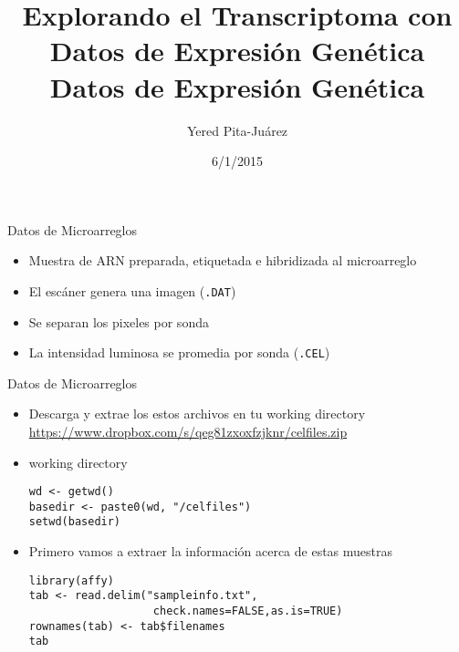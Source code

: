\documentclass{beamer}
\begin{document}
\title[Datos de Expresi\'{o}n Gen\'{e}tica]{Explorando el Transcriptoma con Datos de Expresi\'{o}n Gen\'{e}tica\\
\vspace{0.5cm}
Datos de Expresi\'{o}n Gen\'{e}tica}
\author{Yered Pita-Ju\'{a}rez}
\date{6/1/2015}


\begin{frame}
\titlepage
\end{frame}


\begin{frame}{Datos de Microarreglos}
\begin{itemize}
\item Muestra de ARN preparada, etiquetada e hibridizada al microarreglo
\item El escáner genera una imagen (\texttt{.DAT})
\item Se separan los pixeles por sonda
\item La intensidad luminosa se promedia por sonda (\texttt{.CEL})
\end{itemize}
\end{frame}

\begin{frame}[fragile]{Datos de Microarreglos}
\begin{itemize}
\item Descarga y extrae los estos archivos en tu working directory\\
\url{https://www.dropbox.com/s/qeg81zxoxfzjknr/celfiles.zip}
\item working directory
\begin{verbatim}
wd <- getwd()
basedir <- paste0(wd, "/celfiles")
setwd(basedir)
\end{verbatim}
\item Primero vamos a extraer la información acerca de estas muestras
\begin{verbatim}
library(affy)
tab <- read.delim("sampleinfo.txt",
				   check.names=FALSE,as.is=TRUE)
rownames(tab) <- tab$filenames
tab
\end{verbatim}
\end{itemize}
\end{frame}
\end{document}
